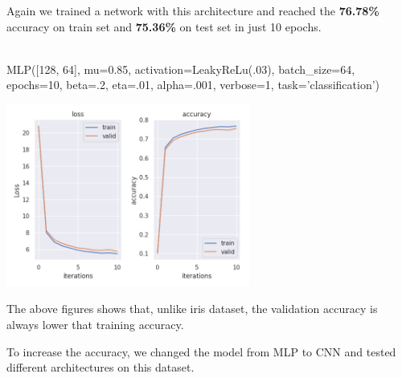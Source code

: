 \documentclass[10pt]{SelfArx} %
\begin{document}
Again we trained a network with this architecture and reached the \textbf{76.78\%} accuracy on train set and \textbf{75.36\%} on test set in just 10 epochs.
\\
\\
\begin{python}
MLP([128, 64], mu=0.85,
activation=LeakyReLu(.03),
batch_size=64, epochs=10, 
beta=.2, eta=.01, alpha=.001,
verbose=1, task='classification')
\end{python}
\begin{center}
	\includegraphics[width=\linewidth,height=6cm]{img/fashion-plots2}
	\label{ffashion2}
\end{center}
The above figures shows that, unlike iris dataset, the validation accuracy is always lower that training accuracy. 

To increase the accuracy, we changed the model from MLP to CNN and tested different architectures on this dataset.\\
\end{document}
